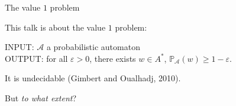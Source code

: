 \documentclass[svgnames]{beamer}
\renewcommand{\AA}{\mathcal{A}}
\newcommand{\prob}[1]{\mathbb{P}_{#1}}
\begin{document}
\begin{frame}{The value $1$ problem}
\begin{center}
This talk is about the value $1$ problem:
\end{center}
\begin{framed}
INPUT: $\AA$ a probabilistic automaton\\
OUTPUT: for all $\varepsilon > 0$, there exists $w \in A^*$,
$\prob{\AA}(w) \ge 1 - \varepsilon$.
\end{framed}
\pause
It is undecidable (Gimbert and Oualhadj, 2010).

\begin{center}
\begin{huge}
But \textit{to what extent}?
\end{huge}
\end{center}
\end{frame}
\end{document}
